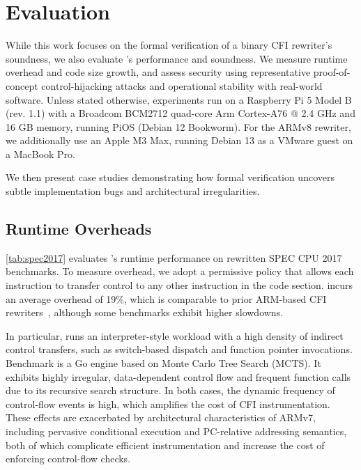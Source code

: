 \section{Evaluation}\label{sec:eval}

While this work focuses on the formal verification of a binary CFI rewriter’s soundness, we also evaluate \pname’s performance and soundness. We measure runtime overhead and code size growth, and assess security using representative proof-of-concept control-hijacking attacks and operational stability with real-world software.
%
Unless stated otherwise, experiments run on a Raspberry Pi 5 Model B (rev. 1.1) with a Broadcom BCM2712 quad-core Arm Cortex-A76 @ 2.4 GHz and 16 GB memory, running PiOS (Debian 12 Bookworm).
For the ARMv8 rewriter, we additionally use an Apple M3 Max, running Debian 13 as a VMware guest on a MacBook Pro.

We then present case studies demonstrating how formal verification uncovers subtle implementation bugs and architectural irregularities.

\subsection{Runtime Overheads}

\autoref{tab:spec2017}  evaluates \pname's runtime performance on rewritten SPEC CPU 2017 benchmarks. To measure overhead, we adopt a permissive policy that allows each instruction to transfer control to any other instruction in the code section. \pname incurs an average overhead of 19\%, which is comparable to prior ARM-based CFI rewriters~\cite{walls_et_al}, although some benchmarks exhibit higher slowdowns.

In particular,  runs an interpreter-style workload with a high density of indirect control transfers, such as switch-based dispatch and function pointer invocations. Benchmark  is a Go engine based on Monte Carlo Tree Search (MCTS). It exhibits highly irregular, data-dependent control flow and frequent function calls due to its recursive search structure. In both cases, the dynamic frequency of control-flow events is high, which amplifies the cost of CFI instrumentation.
%
These effects are exacerbated by architectural characteristics of ARMv7, including pervasive conditional execution and PC-relative addressing semantics, both of which complicate efficient instrumentation and increase the cost of enforcing control-flow checks.

